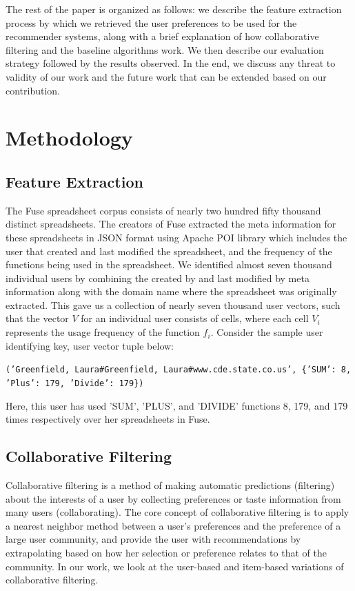 \documentclass{article} %
\begin{document}
The rest of the paper is organized as follows: we describe the feature extraction process by which we retrieved the user preferences to be used for the recommender systems, along with a brief explanation of how collaborative filtering and the baseline algorithms work. We then describe our evaluation strategy followed by the results observed. In the end, we discuss any threat to validity of our work and the future work that can be extended based on our contribution.

\section{Methodology}
\subsection{Feature Extraction}
The Fuse spreadsheet corpus consists of nearly two hundred fifty thousand distinct spreadsheets. The creators of Fuse extracted the meta information for these spreadsheets in JSON format using Apache POI library which includes the user that created and last modified the spreadsheet, and the frequency of the functions being used in the spreadsheet. We identified almost seven thousand individual users by combining the created by and last modified by meta information along with the domain name where the spreadsheet was originally extracted. This gave us a collection of nearly seven thousand user vectors, such that the vector $V$ for an individual user consists of cells, where each cell $V_{i}$ represents the usage frequency of the function $f_{i}$. Consider the sample user identifying key, user vector tuple below:
\begin{center}
   \texttt{('Greenfield, Laura\#Greenfield, Laura\#www.cde.state.co.us', \{'SUM': 8, 'Plus': 179, 'Divide': 179\})}
\end{center}
Here, this user has used 'SUM', 'PLUS', and 'DIVIDE' functions 8, 179, and 179 times respectively over her spreadsheets in Fuse.

\subsection{Collaborative Filtering}
Collaborative filtering is a method of making automatic predictions (filtering) about the interests of a user by collecting preferences or taste information from many users (collaborating). The core concept of collaborative filtering is to apply a nearest neighbor method between a user's preferences and the preference of a large user community, and provide the user with recommendations by extrapolating based on how her selection or preference relates to that of the community. In our work, we look at the user-based and item-based variations of collaborative filtering.
\end{document}
